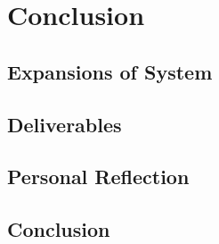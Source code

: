 \chapter{Conclusion}
\label{conclusion}

\section{Expansions of System}

\section{Deliverables}

\section{Personal Reflection}

\section{Conclusion}

